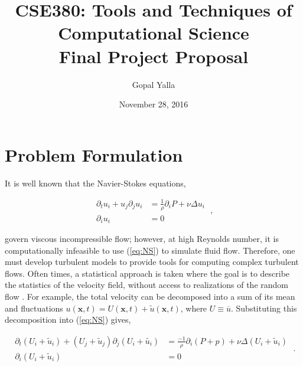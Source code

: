 \documentclass[12pt]{article}
\newcommand{\pr}{\partial}
\begin{document}
 

\title{ {\Large CSE380: Tools and Techniques of Computational Science }\\ {\large Final
Project Proposal}}
\author{Gopal Yalla}
\date{November 28, 2016}
\maketitle
\thispagestyle{empty} 
\newpage 

\thispagestyle{empty} 
\tableofcontents
\newpage 

\setcounter{page}{1}



\section{Problem Formulation}

It is well known that the Navier-Stokes equations,

\begin{equation}
	\begin{split}
		\pr_t u_i + u_j \pr_j u_i &= \frac{1}{\rho} \pr_i P + \nu \Delta
		u_i \\
		\pr_i u_i &= 0 
	\end{split}
	\label{eq:NS}
	\; ,
\end{equation}

\noi govern viscous incompressible flow; however, at high Reynolds number, it
is computationally infeasible to use (\ref{eq:NS}) to simulate fluid flow.  
Therefore, one must develop turbulent models to provide tools for computing 
complex turbulent flows. Often times, a statistical approach is taken where the
goal is to describe the statistics of the velocity field, without access to
realizations of the random flow \cite{DURBIN_BOOK}. For example, the
total velocity can be decomposed into a sum of its mean and fluctuations
$u(\mathbf{x},t) = U(\mathbf{x},t) + \tilde{u}(\mathbf{x},t)$, where $U \equiv
\overline{u}$. Substituting this decomposition into (\ref{eq:NS}) gives, 

\begin{equation*}
	\begin{split}
		\pr_t(U_i + \tilde{u}_i) + (U_j + \tilde{u}_j) \pr_j (U_i +
		\tilde{u_i}) &= \frac{-1}{\rho} \pr_i(P+p) + \nu \Delta (U_i
		+\tilde{u}_i )\\
		\pr_i(U_i + \tilde{u}_i) &=0 
	\end{split}
	\; . 
\end{equation*}
\end{document}
